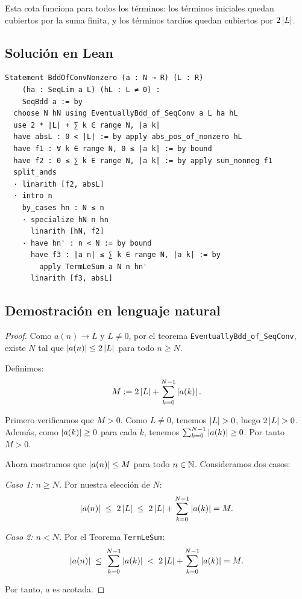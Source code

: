 Esta cota funciona para todos los términos: los términos iniciales
quedan cubiertos por la suma finita, y los términos tardíos quedan
cubiertos por $2\left|L\right|$.

\subsection{Solución en Lean}

\begin{verbatim}
Statement BddOfConvNonzero (a : N → R) (L : R)
    (ha : SeqLim a L) (hL : L ≠ 0) :
    SeqBdd a := by
  choose N hN using EventuallyBdd_of_SeqConv a L ha hL
  use 2 * |L| + ∑ k ∈ range N, |a k|
  have absL : 0 < |L| := by apply abs_pos_of_nonzero hL
  have f1 : ∀ k ∈ range N, 0 ≤ |a k| := by bound
  have f2 : 0 ≤ ∑ k ∈ range N, |a k| := by apply sum_nonneg f1
  split_ands
  · linarith [f2, absL]
  · intro n
    by_cases hn : N ≤ n
    · specialize hN n hn
      linarith [hN, f2]
    · have hn' : n < N := by bound
      have f3 : |a n| ≤ ∑ k ∈ range N, |a k| := by
        apply TermLeSum a N n hn'
      linarith [f3, absL]
\end{verbatim}

\subsection{Demostración en lenguaje natural}

\begin{proof}
Como $a(n) \to L$ y $L \ne 0$, por el teorema
\texttt{EventuallyBdd\_of\_SeqConv}, existe $N$ tal que
$\left|a(n)\right| \le 2\left|L\right|$ para todo $n \ge N$.

Definimos:
\[
  M := 2\left|L\right| + \sum_{k=0}^{N-1} \left|a(k)\right|.
\]

Primero verificamos que $M > 0$. Como $L \ne 0$, tenemos $\left|L\right| > 0$,
luego $2\left|L\right| > 0$. Además, como $\left|a(k)\right| \ge 0$ para cada $k$,
tenemos $\sum_{k=0}^{N-1} \left|a(k)\right| \ge 0$. Por tanto $M > 0$.

Ahora mostramos que $\left|a(n)\right| \le M$ para todo $n \in \mathbb{N}$.
Consideramos dos casos:

\medskip
\noindent\textit{Caso 1: $n \ge N$.}
Por nuestra elección de $N$:
\[
  \left|a(n)\right| \;\le\; 2\left|L\right|
  \;\le\; 2\left|L\right| + \sum_{k=0}^{N-1} \left|a(k)\right| = M.
\]

\noindent\textit{Caso 2: $n < N$.}
Por el Teorema \texttt{TermLeSum}:
\[
  \left|a(n)\right| \;\le\; \sum_{k=0}^{N-1} \left|a(k)\right|
  \;<\; 2\left|L\right| + \sum_{k=0}^{N-1} \left|a(k)\right| = M.
\]

Por tanto, $a$ es acotada.
\end{proof}

